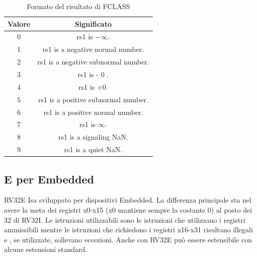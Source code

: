 \documentclass[12pt,a4paper]{report}
\begin{document}
\begin{table}
	\centering
	\begin{tabular}{ | c | c |}
	\hline
	Valore & Significato \\ 
	\hline
	0 & rs1 is  $- \infty$. \\
	1 & rs1 is a negative normal number.\\	
	2 & rs1 is a negative subnormal number.\\	
	3 & rs1 is - 0 .\\	
	4 & rs1 is $+0$.\\	
	5 & rs1 is a positive subnormal number.\\	
	6 & rs1 is a positive normal number.\\	
	7 & rs1 is $\infty$.\\	
	8 & rs1 is a signaling NaN.\\	
	9 &rs1 is a quiet NaN.\\ 
	\hline
	\end{tabular}
	\caption{Formato del risultato di FCLASS}
	\label{Tab:Formato_FCLASS}
\end{table}



\subsection{E per Embedded}
RV32E Isa sviluppato per dispositivi Embedded. La differenza principale sta nel avere la meta dei registri x0-x15 (x0 mantiene sempre la costante 0) al posto dei 32 di RV32I. Le istruzioni utilizzabili sono le istruzioni che utilizzano i registri ammissibili mentre le istruzioni che richiedono i registri x16-x31 risultano illegali e , se utilizzate, sollevano eccezioni. Anche con RV32E può essere estensibile con alcune estensioni standard.
\end{document}
